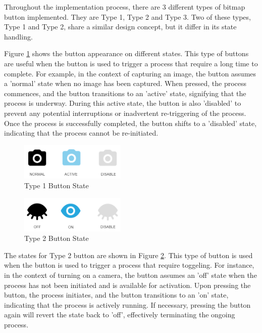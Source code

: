 Throughout the implementation process, there are 3 different types of
bitmap button implemented. They are Type 1, Type 2 and Type 3. Two of these types, Type 1 and Type 2, share a similar design concept, but it differ in its state handling.

Figure \ref{fig:type1_state} shows  the button appearance on different states. This type of buttons are useful when the button is used to trigger a process that require a long time to complete.  For example, in the context of capturing an image, the button assumes a 'normal' state when no image has been captured. When pressed, the process commences, and the button transitions to an 'active' state, signifying that the process is underway. During this active state, the button is also 'disabled' to prevent any potential interruptions or inadvertent re-triggering of the process. Once the process is successfully completed, the button shifts to a 'disabled' state, indicating that the process cannot be re-initiated.

\begin{figure}[!ht]
    \centering
    \includegraphics[width=0.45\textwidth]{texs/Part2/chapter4/image/type1state.png}
    \caption{Type 1 Button State}
    \label{fig:type1_state}
\end{figure}

\begin{figure}[!ht]
    \centering
    \includegraphics[width=0.45\textwidth]{texs/Part2/chapter4/image/type2state.png}
    \caption{Type 2 Button State}
    \label{fig:type2_state}
\end{figure}


The states for Type 2 button are shown in Figure \ref{fig:type2_state}. This type of button is used when the button is used to trigger a process that require toggeling. For instance, in the context of turning on a camera, the button assumes an 'off' state when the process has not been initiated and is available for activation. Upon pressing the button, the process initiates, and the button transitions to an 'on' state, indicating that the process is actively running. If necessary, pressing the button again will revert the state back to 'off', effectively terminating the ongoing process.


